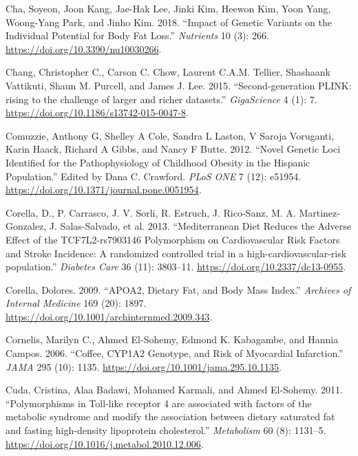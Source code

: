 \documentclass[]{article}
\begin{document}
\leavevmode\hypertarget{ref-Cha2018}{}%
Cha, Soyeon, Joon Kang, Jae-Hak Lee, Jinki Kim, Heewon Kim, Yoon Yang,
Woong-Yang Park, and Jinho Kim. 2018. ``Impact of Genetic Variants on
the Individual Potential for Body Fat Loss.'' \emph{Nutrients} 10 (3):
266. \url{https://doi.org/10.3390/nu10030266}.

\leavevmode\hypertarget{ref-Chang2015}{}%
Chang, Christopher C., Carson C. Chow, Laurent C.A.M. Tellier, Shashaank
Vattikuti, Shaun M. Purcell, and James J. Lee. 2015. ``Second-generation
PLINK: rising to the challenge of larger and richer datasets.''
\emph{GigaScience} 4 (1): 7.
\url{https://doi.org/10.1186/s13742-015-0047-8}.

\leavevmode\hypertarget{ref-Comuzzie2012}{}%
Comuzzie, Anthony G, Shelley A Cole, Sandra L Laston, V Saroja
Voruganti, Karin Haack, Richard A Gibbs, and Nancy F Butte. 2012.
``Novel Genetic Loci Identified for the Pathophysiology of Childhood
Obesity in the Hispanic Population.'' Edited by Dana C. Crawford.
\emph{PLoS ONE} 7 (12): e51954.
\url{https://doi.org/10.1371/journal.pone.0051954}.

\leavevmode\hypertarget{ref-Corella2013}{}%
Corella, D., P. Carrasco, J. V. Sorli, R. Estruch, J. Rico-Sanz, M. A.
Martinez-Gonzalez, J. Salas-Salvado, et al. 2013. ``Mediterranean Diet
Reduces the Adverse Effect of the TCF7L2-rs7903146 Polymorphism on
Cardiovascular Risk Factors and Stroke Incidence: A randomized
controlled trial in a high-cardiovascular-risk population.''
\emph{Diabetes Care} 36 (11): 3803--11.
\url{https://doi.org/10.2337/dc13-0955}.

\leavevmode\hypertarget{ref-Corella2009}{}%
Corella, Dolores. 2009. ``APOA2, Dietary Fat, and Body Mass Index.''
\emph{Archives of Internal Medicine} 169 (20): 1897.
\url{https://doi.org/10.1001/archinternmed.2009.343}.

\leavevmode\hypertarget{ref-Cornelis2006}{}%
Cornelis, Marilyn C., Ahmed El-Sohemy, Edmond K. Kabagambe, and Hannia
Campos. 2006. ``Coffee, CYP1A2 Genotype, and Risk of Myocardial
Infarction.'' \emph{JAMA} 295 (10): 1135.
\url{https://doi.org/10.1001/jama.295.10.1135}.

\leavevmode\hypertarget{ref-Cuda2011}{}%
Cuda, Cristina, Alaa Badawi, Mohamed Karmali, and Ahmed El-Sohemy. 2011.
``Polymorphisms in Toll-like receptor 4 are associated with factors of
the metabolic syndrome and modify the association between dietary
saturated fat and fasting high-density lipoprotein cholesterol.''
\emph{Metabolism} 60 (8): 1131--5.
\url{https://doi.org/10.1016/j.metabol.2010.12.006}.
\end{document}
